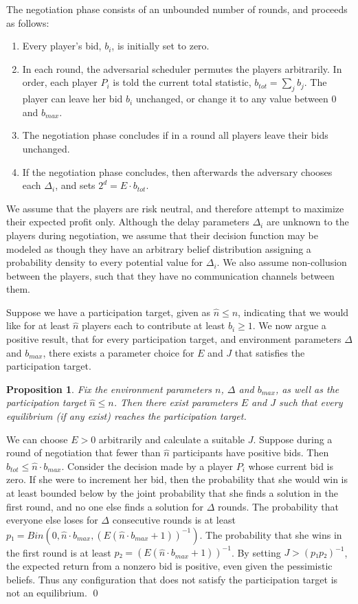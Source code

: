\documentclass[]{article}
\newtheorem{proposition}{Proposition}
\theoremstyle{remark}
\begin{document}
The negotiation phase consists of an unbounded number of rounds, and proceeds as follows:
\begin{enumerate}
\item Every player's bid, $b_i$, is initially set to zero.
\item In each round, the adversarial scheduler permutes the players arbitrarily. In order, each player $P_i$ is told the current total statistic, $b_{tot} = \displaystyle \sum_j b_j$. The player can leave her bid $b_i$ unchanged, or change it to any value between $0$ and $b_{max}$.
\item The negotiation phase concludes if in a round all players leave their bids unchanged.
\item If the negotiation phase concludes, then afterwards the adversary chooses each $Δ_i$, and sets $2^d = E\cdot b_{tot}$.
\end{enumerate}

We assume that the players are risk neutral, and therefore attempt to maximize their expected profit only. Although the delay parameters $Δ_i$ are unknown to the players during negotiation, we assume that their decision function may be modeled as though they have an arbitrary belief distribution assigning a probability density to every potential value for $Δ_i$. We also assume non-collusion between the players, such that they have no communication channels between them.

Suppose we have a participation target, given as $\hat{n} ≤ n$, indicating that we would like for at least $\hat{n}$ players each to contribute at least $b_i ≥ 1$. We now argue a positive result, that for every participation target, and environment parameters $Δ$ and $b_{max}$, there exists a parameter choice for $E$ and $J$ that satisfies the participation target.

\begin{proposition}
Fix the environment parameters $n$, $Δ$ and $b_{max}$, as well as the participation target $\hat{n}≤n$. Then there exist parameters $E$ and $J$ such that every equilibrium (if any exist) reaches the participation target.
\end{proposition}
\proof We can choose $E>0$ arbitrarily and calculate a suitable $J$. Suppose during a round of negotiation that fewer than $\hat{n}$ participants have positive bids. Then $b_{tot} ≤ \hat{n}\cdot b_{max}$. Consider the decision made by a player $P_i$ whose current bid is zero. If she were to increment her bid, then the probability that she would win is at least bounded below by the joint probability that she finds a solution in the first round, and no one else finds a solution for $Δ$ rounds. The probability that everyone else loses for $Δ$ consecutive rounds is at least $p₁ = Bin\left(0,\hat{n}\cdot b_{max}, \left(E(\hat{n}\cdot b_{max}+1)\right)^{-1}\right)$. The probability that she wins in the first round is at least $p₂ = \left(E(\hat{n}\cdot b_{max}+1)\right)^{-1}$. By setting $J > (p₁p₂)^{-1}$, the expected return from a nonzero bid is positive, even given the pessimistic beliefs. Thus any configuration that does not satisfy the participation target is not an equilibrium. \qed
\end{document}
